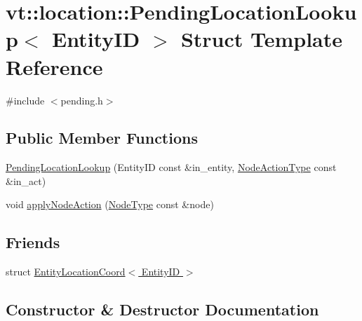 \hypertarget{structvt_1_1location_1_1_pending_location_lookup}{}\section{vt\+:\+:location\+:\+:Pending\+Location\+Lookup$<$ Entity\+ID $>$ Struct Template Reference}
\label{structvt_1_1location_1_1_pending_location_lookup}


{\ttfamily \#include $<$pending.\+h$>$}

\subsection*{Public Member Functions}
\begin{DoxyCompactItemize}
\item 
\hyperlink{structvt_1_1location_1_1_pending_location_lookup_a31dee6a196bcc0fee50bdb983497b1f5}{Pending\+Location\+Lookup} (Entity\+ID const \&in\+\_\+entity, \hyperlink{namespacevt_1_1location_a3a9235e0ceb341bef225d2cc46606e9e}{Node\+Action\+Type} const \&in\+\_\+act)
\item 
void \hyperlink{structvt_1_1location_1_1_pending_location_lookup_a8e23682547f207d5403a0ee6a2224f37}{apply\+Node\+Action} (\hyperlink{namespacevt_a866da9d0efc19c0a1ce79e9e492f47e2}{Node\+Type} const \&node)
\end{DoxyCompactItemize}
\subsection*{Friends}
\begin{DoxyCompactItemize}
\item 
struct \hyperlink{structvt_1_1location_1_1_pending_location_lookup_abf8115ee4795af8b482a657aa6195a6a}{Entity\+Location\+Coord$<$ Entity\+I\+D $>$}
\end{DoxyCompactItemize}


\subsection{Constructor \& Destructor Documentation}
\mbox{\label{structvt_1_1location_1_1_pending_location_lookup_a31dee6a196bcc0fee50bdb983497b1f5}} 
